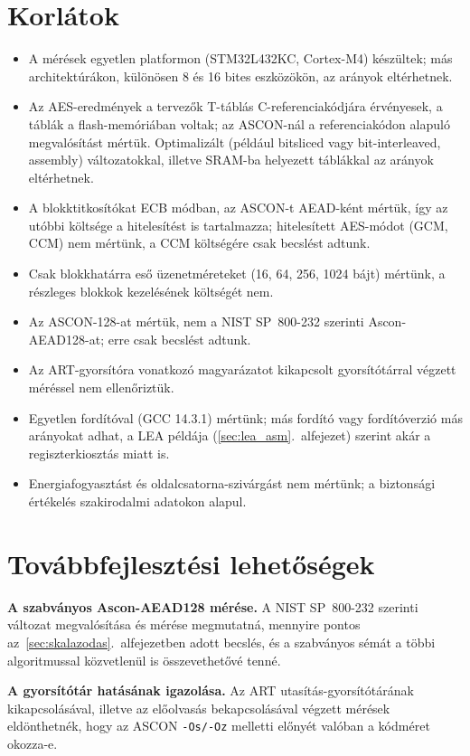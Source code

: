 \documentclass[a4paper,12pt]{report}
\theoremstyle{definition}
\theoremstyle{remark}
\begin{document}
\section{Korlátok}

\begin{itemize}
	\item A mérések egyetlen platformon (STM32L432KC, Cortex-M4) készültek; más architektúrákon, különösen 8 és 16 bites eszközökön, az arányok eltérhetnek.
	\item Az AES-eredmények a tervezők T-táblás C-referenciakódjára érvényesek, a táblák a flash-memóriában voltak; az ASCON-nál a referenciakódon alapuló megvalósítást mértük. Optimalizált (például bitsliced vagy bit-interleaved, assembly) változatokkal, illetve SRAM-ba helyezett táblákkal az arányok eltérhetnek.
	\item A blokktitkosítókat ECB módban, az ASCON-t AEAD-ként mértük, így az utóbbi költsége a hitelesítést is tartalmazza; hitelesített AES-módot (GCM, CCM) nem mértünk, a CCM költségére csak becslést adtunk.
	\item Csak blokkhatárra eső üzenetméreteket (16, 64, 256, 1024 bájt) mértünk, a részleges blokkok kezelésének költségét nem.
	\item Az ASCON-128-at mértük, nem a NIST SP~800-232 szerinti Ascon-AEAD128-at; erre csak becslést adtunk.
	\item Az ART-gyorsítóra vonatkozó magyarázatot kikapcsolt gyorsítótárral végzett méréssel nem ellenőriztük.
	\item Egyetlen fordítóval (GCC 14.3.1) mértünk; más fordító vagy fordítóverzió más arányokat adhat, a LEA példája (\ref{sec:lea_asm}.~alfejezet) szerint akár a regiszterkiosztás miatt is.
	\item Energiafogyasztást és oldalcsatorna-szivárgást nem mértünk; a biztonsági értékelés szakirodalmi adatokon alapul.
\end{itemize}

\section{Továbbfejlesztési lehetőségek}\label{sec:tovabbfejlesztes}

\textbf{A szabványos Ascon-AEAD128 mérése.} A NIST SP~800-232 szerinti változat megvalósítása és mérése megmutatná, mennyire pontos az~\ref{sec:skalazodas}.~alfejezetben adott becslés, és a szabványos sémát a többi algoritmussal közvetlenül is összevethetővé tenné.

\textbf{A gyorsítótár hatásának igazolása.} Az ART utasítás-gyorsítótárának kikapcsolásával, illetve az előolvasás bekapcsolásával végzett mérések eldönthetnék, hogy az ASCON \texttt{-Os/-Oz} melletti előnyét valóban a kódméret okozza-e.
\end{document}
